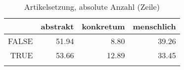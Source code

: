 \begin{table}[ht]
\centering
\begin{tabular}{rrrr}
  \lsptoprule
 & abstrakt & konkretum & menschlich \\ 
  \midrule
FALSE & 51.94 & 8.80 & 39.26 \\ 
  TRUE & 53.66 & 12.89 & 33.45 \\ 
   \lspbottomrule
\end{tabular}
\caption{Artikelsetzung, absolute Anzahl (Zeile)} 
\end{table}
